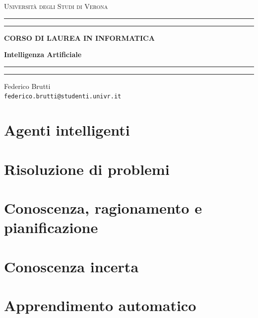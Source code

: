\documentclass[12pt,a4paper,oneside]{book}
\begin{document}
	
	\begin{titlepage}
		\begin{center}
			{{\LARGE{\textsc{Università degli Studi di Verona}}}} \rule[0.1cm]{15.8cm}{0.1mm}
			\rule[0.5cm]{15.8cm}{0.6mm}
			{\small{\bf CORSO DI LAUREA IN INFORMATICA }}
		\end{center}
		\vspace{12.5mm}
		
		\begin{center}
			{\Huge{\bf Intelligenza Artificiale}}
		\end{center}
		\vspace{130mm}
		
		\begin{minipage}[l]{1.8mm}
			\rule[0.1cm]{0.1mm}{2cm}
			\rule[0.1cm]{0.6mm}{2cm}
		\end{minipage}
		\hspace{2mm}
		\begin{minipage}{10cm}	
			{\large{Federico Brutti\\
			\texttt{federico.brutti@studenti.univr.it}}}
		\end{minipage}
	\end{titlepage}
	
	\blankpage
	\tableofcontents
	
	\chapter{Agenti intelligenti}
	
	\chapter{Risoluzione di problemi}
	
	\chapter{Conoscenza, ragionamento e pianificazione}
	
	\chapter{Conoscenza incerta}
	
	\chapter{Apprendimento automatico}
	
\end{document}
